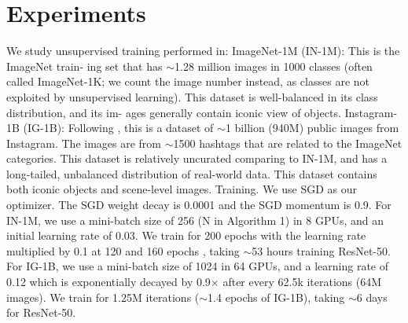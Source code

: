 \documentclass[10pt,twocolumn]{article}  %
\begin{document}
\section{Experiments}
\hspace{1em} We study unsupervised training performed in:
ImageNet-1M (IN-1M): This is the ImageNet \cite{11_deng2009imagenet} train-
ing set that has $\sim$1.28 million images in 1000 classes (often
called ImageNet-1K; we count the image number instead,
as classes are not exploited by unsupervised learning). This
dataset is well-balanced in its class distribution, and its im-
ages generally contain iconic view of objects.
Instagram-1B (IG-1B): Following \cite{44_mahajan2018exploring}, this is a dataset
of $\sim$1 billion (940M) public images from Instagram. The
images are from $\sim$1500 hashtags \cite{44_mahajan2018exploring} that are related to the
ImageNet categories. This dataset is relatively uncurated
comparing to IN-1M, and has a long-tailed, unbalanced
distribution of real-world data. This dataset contains both
iconic objects and scene-level images.
Training. We use SGD as our optimizer. The SGD weight
decay is 0.0001 and the SGD momentum is 0.9. For IN-1M,
we use a mini-batch size of 256 (N in Algorithm 1) in 8
GPUs, and an initial learning rate of 0.03. We train for 200
epochs with the learning rate multiplied by 0.1 at 120 and
160 epochs \cite{61_wu2018unsupervised}, taking $\sim$53 hours training ResNet-50. For
IG-1B, we use a mini-batch size of 1024 in 64 GPUs, and
a learning rate of 0.12 which is exponentially decayed by
0.9$\times $ after every 62.5k iterations (64M images). We train
for 1.25M iterations ($\sim$1.4 epochs of IG-1B), taking $\sim$6 days
for ResNet-50.
\end{document}
